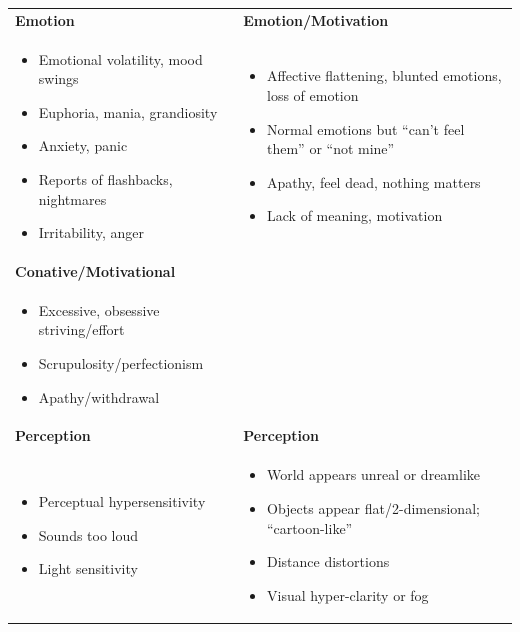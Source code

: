 \documentclass[11pt,oneside]{book}
\newenvironment{compactitemize}
{\begin{itemize}[nosep, leftmargin=1em, itemsep=0pt, topsep=0pt]}
{\end{itemize}}
\begin{document}
\begin{longtable}{>{\raggedright\arraybackslash}p{}|>{\raggedright\arraybackslash}p{}}
\addlinespace[1em]
\textbf{Emotion} & \textbf{Emotion/Motivation} \\
\begin{compactitemize}
\item Emotional volatility, mood swings
\item Euphoria, mania, grandiosity
\item Anxiety, panic
\item Reports of flashbacks, nightmares
\item Irritability, anger
\end{compactitemize}
&
\begin{compactitemize}
\item Affective flattening, blunted emotions, loss of emotion
\item Normal emotions but \enquote{can't feel them} or \enquote{not mine}
\item Apathy, feel dead, nothing matters
\item Lack of meaning, motivation
\end{compactitemize} \\

\addlinespace[1em]
\textbf{Conative/Motivational} & \\
\begin{compactitemize}
\item Excessive, obsessive striving/effort
\item Scrupulosity/perfectionism
\item Apathy/withdrawal
\end{compactitemize}
& \\

\addlinespace[1em]
\textbf{Perception} & \textbf{Perception} \\
\begin{compactitemize}
\item Perceptual hypersensitivity
\item Sounds too loud
\item Light sensitivity
\end{compactitemize}
&
\begin{compactitemize}
\item World appears unreal or dreamlike
\item Objects appear flat/2-dimensional; \enquote{cartoon-like}
\item Distance distortions
\item Visual hyper-clarity or fog
\end{compactitemize} \\


\end{longtable}
\end{document}
